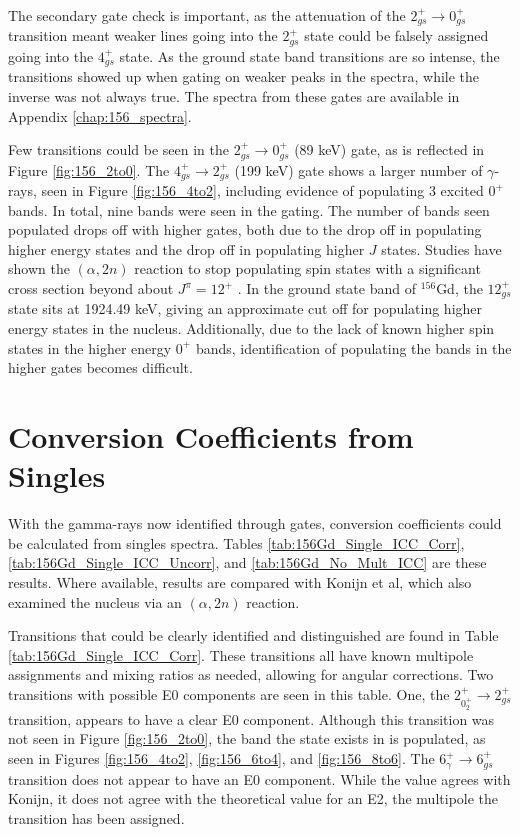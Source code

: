 

The secondary gate check is important, as the attenuation of the $2_{gs}^+\rightarrow0_{gs}^+$ transition meant weaker lines going into the $2_{gs}^+$ state could be falsely assigned going into the $4_{gs}^+$ state. As the ground state band transitions are so intense, the transitions showed up when gating on weaker peaks in the spectra, while the inverse was not always true. The spectra from these gates are available in Appendix \ref{chap:156_spectra}.

Few transitions could be seen in the $2_{gs}^+\rightarrow0_{gs}^+$ (89 keV) gate, as is reflected in Figure \ref{fig:156_2to0}. The $4_{gs}^+\rightarrow2_{gs}^+$ (199 keV) gate shows a larger number of $\gamma$-rays, seen in Figure \ref{fig:156_4to2}, including evidence of populating 3 excited $0^+$ bands. In total, nine bands were seen in the gating. The number of bands seen populated drops off with higher gates, both due to the drop off in populating higher energy states and the drop off in populating higher $J$ states. Studies have shown the $(\alpha,2n)$ reaction to stop populating spin states with a significant cross section beyond about $J^{\pi}=12^+$ \citep{wu93:_a2n}. In the ground state band of $^{156}$Gd, the $12^+_{gs}$ state sits at 1924.49 keV, giving an approximate cut off for populating higher energy states in the nucleus. Additionally, due to the lack of known higher spin states in the higher energy $0^+$ bands, identification of populating the bands in the higher gates becomes difficult.

\section{Conversion Coefficients from Singles}

With the gamma-rays now identified through gates, conversion coefficients could be calculated from singles spectra. Tables \ref{tab:156Gd_Single_ICC_Corr}, \ref{tab:156Gd_Single_ICC_Uncorr}, and \ref{tab:156Gd_No_Mult_ICC} are these results. Where available, results are compared with Konijn et al\citep{konijn81:_156gd}, which also examined the nucleus via an $(\alpha,2n)$ reaction.

Transitions that could be clearly identified and distinguished are found in Table \ref{tab:156Gd_Single_ICC_Corr}. These transitions all have known multipole assignments and mixing ratios as needed, allowing for angular corrections. Two transitions with possible E0 components are seen in this table. One, the $2^+_{0^+_{2}}\rightarrow 2^+_{gs}$ transition, appears to have a clear E0 component. Although this transition was not seen in Figure \ref{fig:156_2to0}, the band the state exists in is populated, as seen in Figures \ref{fig:156_4to2}, \ref{fig:156_6to4}, and \ref{fig:156_8to6}. The $6^+_{\gamma}\rightarrow 6^+_{gs}$ transition does not appear to have an E0 component. While the value agrees with Konijn\citep{konijn81:_156gd}, it does not agree with the theoretical value for an E2, the multipole the transition has been assigned.

